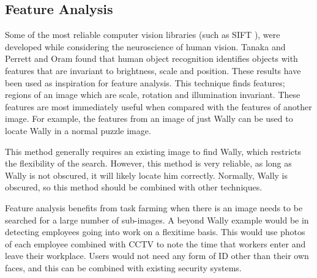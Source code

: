 \documentclass[../main.tex]{subfiles}
\begin{document}
    \subsection{Feature Analysis}
    Some of the most reliable computer vision libraries (such as SIFT \cite{sift}), were developed while considering the neuroscience of human vision.
    Tanaka\cite{tanakahv} and Perrett and Oram\cite{perretthv} found that human object recognition identifies objects with features that are invariant to brightness, scale and position.
    These results have been used as inspiration for feature analysis.
    This technique finds features; regions of an image which are scale, rotation and illumination invariant.
    These features are most immediately useful when compared with the features of another image.
    For example, the features from an image of just Wally can be used to locate Wally in a normal puzzle image.

    This method generally requires an existing image to find Wally, which restricts the flexibility of the search.
    However, this method is very reliable, as long as Wally is not obscured, it will likely locate him correctly.
    Normally, Wally is obscured, so this method should be combined with other techniques.

    Feature analysis benefits from task farming when there is an image needs to be searched for a large number of sub-images.
    A beyond Wally example would be in detecting employees going into work on a flexitime basis.
    This would use photos of each employee combined with CCTV to note the time that workers enter and leave their workplace.
    Users would not need any form of ID other than their own faces, and this can be combined with existing security systems.    
\end{document}
